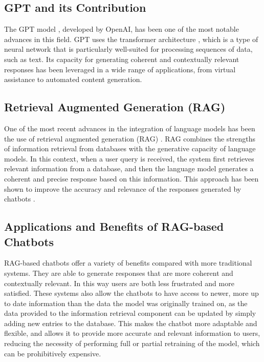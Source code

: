 \documentclass[a4paper,12pt,twoside]{ThesisStyle}
\begin{document}
\subsection{GPT and its Contribution}
\label{subsec:gpt}

The GPT model \cite{Radford2018ImprovingLU}, developed by OpenAI, has been one of the most notable advances in this field. GPT uses the transformer architecture \cite{Vaswani2023AttentionNeed}, which is a type of neural network that is particularly well-suited for processing sequences of data, such as text. Its capacity for generating coherent and contextually relevant responses has been leveraged in a wide range of applications, from virtual assistance to automated content generation.

\subsection{Retrieval Augmented Generation (RAG)}
\label{subsec:rag}

One of the most recent advances in the integration of language models has been the use of retrieval augmented generation (RAG) \cite{Lewis2021RetrievalAugmentedGeneration}. RAG combines the strengths of information retrieval from databases with the generative capacity of language models. In this context, when a user query is received, the system first retrieves relevant information from a database, and then the language model generates a coherent and precise response based on this information. This approach has been shown to improve the accuracy and relevance of the responses generated by chatbots \cite{Lewis2021RetrievalAugmentedGeneration}.

\subsection{Applications and Benefits of RAG-based Chatbots}
\label{subsec:applications}

RAG-based chatbots offer a variety of benefits compared with more traditional systems. They are able to generate responses that are more coherent and contextually relevant. In this way users are both less frustrated and more satisfied. These systems also allow the chatbots to have access to newer, more up to date information than the data the model was originally trained on, as the data provided to the information retrieval component can be updated by simply adding new entries to the database. This makes the chatbot more adaptable and flexible, and allows it to provide more accurate and relevant information to users, reducing the necessity of performing full or partial retraining of the model, which can be prohibitively expensive.
\end{document}
